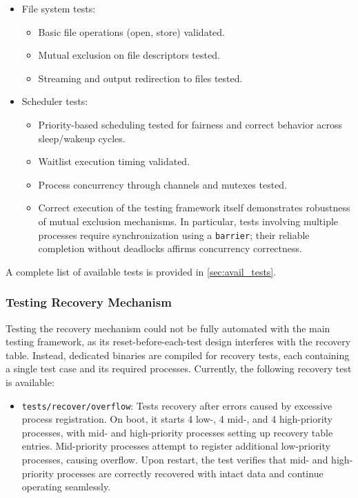 \begin{itemize}
    \item File system tests:
        \begin{itemize}
            \item Basic file operations (open, store) validated.
            \item Mutual exclusion on file descriptors tested.
            \item Streaming and output redirection to files tested.
        \end{itemize}

    \item Scheduler tests:
        \begin{itemize}
            \item Priority-based scheduling tested for fairness and correct behavior
                across sleep/wakeup cycles.
            \item Waitlist execution timing validated.
            \item Process concurrency through channels and mutexes tested.
            \item Correct execution of the testing framework itself demonstrates
                robustness of mutual exclusion mechanisms. In particular, tests
                involving multiple processes require synchronization using a
                \lstinline[style=myagc]|barrier|; their reliable completion without
                deadlocks affirms concurrency correctness.
        \end{itemize}
\end{itemize}

A complete list of available tests is provided in \autoref{sec:avail_tests}.

\ifsubmission\newpage\fi
\subsubsection{Testing Recovery Mechanism} 

Testing the recovery mechanism could not be fully automated with the main testing
framework, as its reset-before-each-test design interferes with the recovery table.
Instead, dedicated binaries are compiled for recovery tests, each containing a single
test case and its required processes. Currently, the following recovery test is
available:
\begin{itemize}
    \item \lstinline[style=myagc]|tests/recover/overflow|: Tests recovery after errors
        caused by excessive process registration. On boot, it starts 4 low-, 4 mid-,
        and 4 high-priority processes, with mid- and high-priority processes setting up
        recovery table entries. Mid-priority processes attempt to register additional
        low-priority processes, causing overflow. Upon restart, the test verifies that
        mid- and high-priority processes are correctly recovered with intact data and
        continue operating seamlessly.
\end{itemize}


